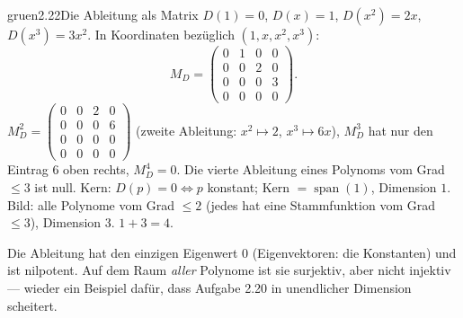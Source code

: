 \begin{loesungkarte}{gruen}{2.22}{Die Ableitung als Matrix}
$D(1) = 0$, $D(x) = 1$, $D(x^{2}) = 2x$, $D(x^{3}) = 3x^{2}$. In Koordinaten bezüglich $(1, x, x^{2}, x^{3})$:
\[ M_D = \begin{pmatrix}0 & 1 & 0 & 0\\ 0 & 0 & 2 & 0\\ 0 & 0 & 0 & 3\\ 0 & 0 & 0 & 0\end{pmatrix}. \]
$M_D^{2} = \begin{pmatrix}0 & 0 & 2 & 0\\ 0 & 0 & 0 & 6\\ 0 & 0 & 0 & 0\\ 0 & 0 & 0 & 0\end{pmatrix}$ (zweite Ableitung: $x^{2}\mapsto2$, $x^{3}\mapsto6x$), $M_D^{3}$ hat nur den Eintrag $6$ oben rechts, $M_D^{4} = 0$. Die vierte Ableitung eines Polynoms vom Grad $\le3$ ist null.
Kern: $D(p) = 0\iff p$ konstant; Kern $= \operatorname{span}(1)$, Dimension $1$. Bild: alle Polynome vom Grad $\le2$ (jedes hat eine Stammfunktion vom Grad $\le3$), Dimension $3$. $1 + 3 = 4$. \checkmark
{}
\begin{mitnehmen}\kastentext
Die Ableitung hat den einzigen Eigenwert $0$ (Eigenvektoren: die Konstanten) und ist nilpotent. Auf dem Raum \emph{aller} Polynome ist sie surjektiv, aber nicht injektiv --- wieder ein Beispiel dafür, dass Aufgabe 2.20 in unendlicher Dimension scheitert.
\end{mitnehmen}
\end{loesungkarte}

